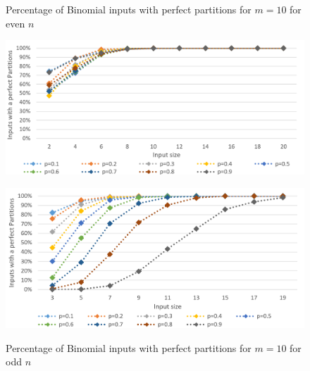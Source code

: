 \begin{figure}[h]
      \centering
      \begin{minipage}[b]{0.45\textwidth}
            \caption{Percentage of Binomial inputs with perfect partitions for $m = 10$ for even $n$}
            \includegraphics[width=\textwidth]{figures/images/solvabilityOfInputs/binomial_Input_Solvable_m10_even.png}\label{fig:firstBinPercentageEven}
      \end{minipage}
      \hspace{0.75cm}
      \begin{minipage}[b]{0.45\textwidth}
            \caption{Percentage of Binomial inputs with perfect partitions for $m = 10$ for odd $n$}
            \includegraphics[width=\textwidth]{figures/images/solvabilityOfInputs/binomial_Input_Solvable_m10_uneven.png}\label{fig:firstBinPercentageUneven}
      \end{minipage}
\end{figure}

